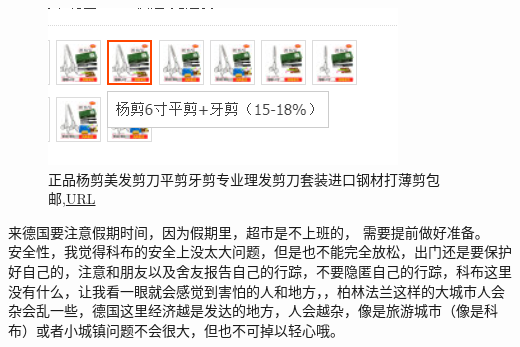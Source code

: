 \documentclass[doku.tex]{subfiles}
\begin{document}
\begin{figure}[H]
	\centering
	\includegraphics[width=0.7\linewidth]{screenshot003}
	\caption{正品杨剪美发剪刀平剪牙剪专业理发剪刀套装进口钢材打薄剪包邮,\href{https://item.taobao.com/item.htm?spm=a1z09.2.0.0.70932e8d1wonf8&id=12950418954&_u=avoelvl5e94}{URL}}
	\label{fig:screenshot003}
\end{figure}

来德国要注意假期时间，因为假期里，超市是不上班的， 需要提前做好准备。\\

安全性，我觉得科布的安全上没太大问题，但是也不能完全放松，出门还是要保护好自己的，注意和朋友以及舍友报告自己的行踪，不要隐匿自己的行踪，科布这里没有什么，让我看一眼就会感觉到害怕的人和地方，，柏林法兰这样的大城市人会杂会乱一些，德国这里经济越是发达的地方，人会越杂，像是旅游城市（像是科布）或者小城镇问题不会很大，但也不可掉以轻心哦。
\end{document}
